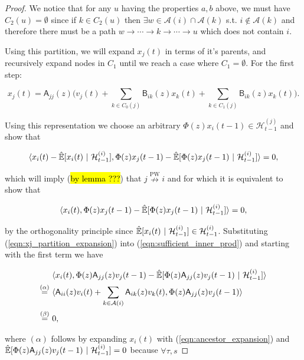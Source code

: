\documentclass[12pt]{article}
\def\npwgc{\overset{\text{PW}}{\nrightarrow}}  %
\def\B{\mathsf{B}}  %
\def\A{\mathsf{A}}  %
\def\H{\mathcal{H}}  %
\newcommand{\linE}[2]{\hat{\E}[#1\ |\ #2]}  %
\newcommand{\anc}[1]{\mathcal{A}(#1)}  %
\begin{document}
\begin{proof}
  We notice that for any $u$ having the properties $a, b$ above, we must have $C_2(u) = \emptyset$ since if $k \in C_2(u)$ then $\exists w \in \anc{i} \cap \anc{k}$ s.t. $i \not \in \anc{k}$ and therefore there must be a path $w \rightarrow \cdots \rightarrow k \rightarrow \cdots \rightarrow u$ which does not contain $i$.

  Using this partition, we will expand $x_j(t)$ in terms of it's parents, and recursively expand nodes in $C_1$ until we reach a case where $C_1 = \emptyset$.  For the first step:  %

  \begin{equation}
    \label{eqn:xj_partition_expansion}
    x_j(t) = \A_{jj}(z)\Big(v_j(t) + \sum_{k \in C_0(j)}\B_{ik}(z)x_k(t) + \sum_{k \in C_1(j)}\B_{ik}(z)x_k(t)\Big).
  \end{equation}

  Using this representation we choose an arbitrary $\Phi(z) x_i(t - 1) \in \H_{t - 1}^{(j)}$ and show that

  \begin{equation}
    \inner{x_i(t) - \linE{x_i(t)}{\H_{t - 1}^{(i)}}}{\Phi(z)x_j(t - 1) - \linE{\Phi(z)x_j(t - 1)}{\H_{t - 1}^{(i)}}} = 0,
  \end{equation}

  which will imply (\hl{by lemma ???}) that $j \npwgc i$ and for which it is equivalent to show that

  \begin{equation}
    \label{eqn:sufficient_inner_prod}
    \inner{x_i(t)}{\Phi(z)x_j(t - 1) - \linE{\Phi(z)x_j(t - 1)}{\H_{t - 1}^{(i)}}} = 0,
  \end{equation}

  by the orthogonality principle since $\linE{x_i(t)}{\H_{t - 1}^{(i)}} \in \H_{t - 1}^{(i)}$.  Substituting (\ref{eqn:xj_partition_expansion}) into (\ref{eqn:sufficient_inner_prod}) and starting with the first term we have

  \begin{align*}
    &\inner{x_i(t)}{\Phi(z)\A_{jj}(z)v_j(t - 1) - \linE{\Phi(z)\A_{jj}(z)v_j(t - 1)}{\H_{t - 1}^{(i)}}}\\
    \overset{(\alpha)}{=}\ &\inner{\A_{ii}(z)v_i(t) + \sum_{k \in \anc{i}}\A_{ik}(z)v_k(t)}{\Phi(z)\A_{jj}(z)v_j(t - 1)}\\
    \overset{(\beta)}{=}\ &0,
  \end{align*}

  where $(\alpha)$ follows by expanding $x_i(t)$ with (\ref{eqn:ancestor_expansion}) and $\linE{\Phi(z)\A_{jj}(z)v_j(t - 1)}{\H_{t - 1}^{(i)}} = 0$ because $\forall \tau, s$


\end{proof}
\end{document}
